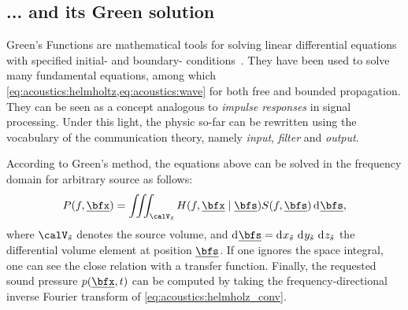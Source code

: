 \subsection{... and its Green solution}
Green's Functions are mathematical tools for solving linear differential equations with specified initial- and boundary- conditions~.
They have been used to solve many fundamental equations, among which \cref{eq:acoustics:helmholtz,eq:acoustics:wave} for both free and bounded propagation.
They can be seen as a concept analogous to \emph{impulse responses} in signal processing.
Under this light, the physic so-far can be rewritten using the vocabulary of the communication theory, namely \textit{input}, \textit{filter} and \textit{output}.

\mynewline
According to Green's method, the equations above can be solved in the frequency domain for arbitrary source as follows:
\begin{equation}
    \label{eq:acoustics:helmholz_conv}
    P(f, \positionMicrophone) = \iiint_{\volume_{\contSource}} H(f, \positionMicrophone \mid \positionSource) S(f, \positionSource) \kdiff\positionSource
    ,
\end{equation}
where $\volume_{\contSource}$ denotes the source volume,
and  $\kdiff\positionSource =  \kdiff{x_{\contSource}}\,\kdiff{y_{\contSource}}\,\kdiff{z_{\contSource}}$ the  differential  volume element at position $\positionSource$.
If one ignores the space integral, one can see the close relation with a transfer function.
Finally, the requested sound pressure $\pressureSpaceTime$ can be computed by taking the frequency-directional inverse Fourier transform of \cref{eq:acoustics:helmholz_conv}.

